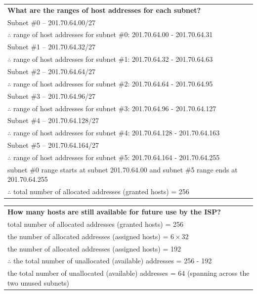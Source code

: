\documentclass[a4paper]{systems-software}
\begin{document}
\begin{longtabu} to \textwidth {| X[1,l] |}
	\hline
	\textbf{What are the ranges of host addresses for each subnet?} \\
	\vspace{2.5mm}
	Subnet \#0 -- 201.70.64.00/27 \\
	$\therefore$ range of host addresses for subnet \#0: 201.70.64.00 - 201.70.64.31 \\
	\vspace{1.5mm}
	Subnet \#1 -- 201.70.64.32/27 \\
	$\therefore$ range of host addresses for subnet \#1: 201.70.64.32 - 201.70.64.63 \\
	\vspace{1.5mm}
	Subnet \#2 -- 201.70.64.64/27 \\
	$\therefore$ range of host addresses for subnet \#2: 201.70.64.64 - 201.70.64.95 \\
	\vspace{1.5mm}
	Subnet \#3 -- 201.70.64.96/27 \\
	$\therefore$ range of host addresses for subnet \#3: 201.70.64.96 - 201.70.64.127 \\
	\vspace{1.5mm}
	Subnet \#4 -- 201.70.64.128/27 \\
	$\therefore$ range of host addresses for subnet \#4: 201.70.64.128 - 201.70.64.163 \\
	\vspace{1.5mm}
	Subnet \#5 -- 201.70.64.164/27 \\
	$\therefore$ range of host addresses for subnet \#5: 201.70.64.164 - 201.70.64.255 \\
	\vspace{1.5mm}
	subnet \#0 range starts at subnet 201.70.64.00 and subnet \#5 range ends at 201.70.64.255 \\
	$\therefore$ total number of allocated addresses (granted hosts) = 256 \\
	\hline
\end{longtabu}

\newpage

\begin{longtabu} to \textwidth {| X[1,l] |}
	\hline
	\textbf{How many hosts are still available for future use by the ISP?} \\
	\vspace{2.5mm}
	total number of allocated addresses (granted hosts) = 256 \\
	the number of allocated addresses (assigned hosts) = $6\times32$ \\
	the number of allocated addresses (assigned hosts) = 192 \\
	$\therefore$ the total number of unallocated (available) addresses = 256 - 192 \\
	the total number of unallocated (available) addresses = 64 (spanning across the two unused subnets) \\
	\hline
\end{longtabu}
\end{document}
